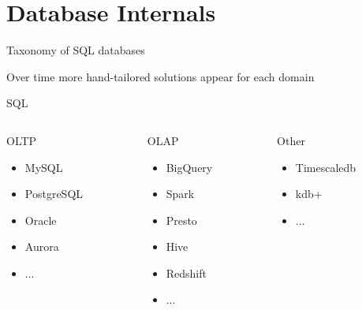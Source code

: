 \documentclass[t,pdf]{beamer}
\begin{document}
\section{Database Internals}
\begin{frame}{Taxonomy of SQL databases}

Over time more hand-tailored solutions appear for each domain

\begin{center}
SQL
\end{center}

\begin{columns}
\begin{column}{0.3\textwidth}
    \begin{center}
    OLTP
    \end{center}
    \begin{itemize}
        \item MySQL
        \item PostgreSQL
        \item Oracle
        \item Aurora
        \item ...
    \end{itemize}
\end{column}
\begin{column}{0.3\textwidth}
    \begin{center}
    OLAP
    \end{center}
    \begin{itemize}
        \item BigQuery
        \item Spark
        \item Presto
        \item Hive
        \item Redshift
        \item ...
    \end{itemize}
\end{column}
\begin{column}{0.3\textwidth}
    \begin{center}
    Other
    \end{center}
    \begin{itemize}
        \item Timescaledb
        \item kdb+
        \item ...
    \end{itemize}
\end{column}
\end{columns}
\end{frame}
\end{document}
